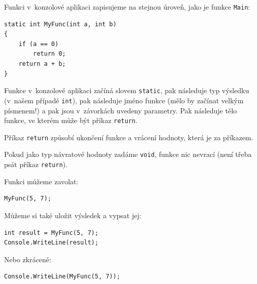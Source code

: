 \documentclass[12pt,a4paper]{article}
\begin{document}
Funkci v~konzolové aplikaci zapisujeme na stejnou úroveň, jako je funkce
\texttt{Main}:
\begin{verbatim}
static int MyFunc(int a, int b)
{
    if (a == 0)
        return 0;
    return a + b;
}
\end{verbatim}

Funkce v~konzolové aplikaci začíná slovem \texttt{static}, pak následuje typ
výsledku (v~našem případě \texttt{int}), pak následuje jméno funkce (mělo by
začínat velkým písmenem!) a pak jsou v~závorkách uvedeny parametry. Pak
následuje tělo funkce, ve kterém může být příkaz \texttt{return}.

Příkaz \texttt{return} způsobí ukončení funkce a vrácení hodnoty, která
je za příkazem.

Pokud jako typ návratové hodnoty zadáme \texttt{void}, funkce nic nevrací
(není třeba psát příkaz \texttt{return}).

Funkci můžeme zavolat:
\begin{verbatim}
MyFunc(5, 7);
\end{verbatim}

Můžeme si také uložit výsledek a vypsat jej:
\begin{verbatim}
int result = MyFunc(5, 7);
Console.WriteLine(result);
\end{verbatim}

Nebo zkráceně:
\begin{verbatim}
Console.WriteLine(MyFunc(5, 7));
\end{verbatim}
\end{document}
